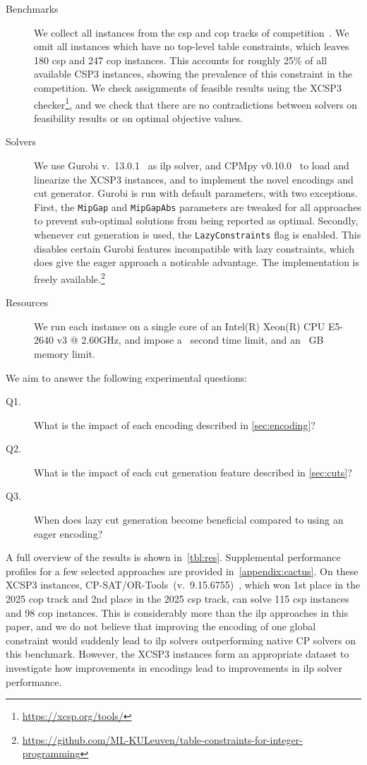 \documentclass[a4paper,UKenglish,cleveref,autoref,thm-restate]{lipics-v2021}
\newcommand{\milp}{\gls{ilp}\xspace}
\begin{document}
\begin{description}
    \item[Benchmarks] We collect all instances from the \gls{csp} and \acrshort{cop} tracks of \XCSPYears competition~\cite{audemard2025proceedings2025xcsp3competition}.
    We omit all instances which have no top-level table constraints, which leaves 180 \gls{csp} and 247 \gls{cop} instances. This accounts for roughly 25\% of all available CSP3 instances, showing the prevalence of this constraint in the competition. We check assignments of feasible results using the XCSP3 checker\footnote{\url{https://xcsp.org/tools/}}, and we check that there are no contradictions between solvers on feasibility results or on optimal objective values.
    \item[Solvers] We use Gurobi v.~13.0.1~\cite{gurobi} as \milp solver, and CPMpy v0.10.0~\cite{guns2019increasing} to load and linearize the XCSP3 instances, and to implement the novel encodings and cut generator. Gurobi is run with default parameters, with two exceptions. First, the \texttt{MipGap} and \texttt{MipGapAbs} parameters are tweaked for all approaches to prevent sub-optimal solutions from being reported as optimal. Secondly, whenever cut generation is used, the \texttt{LazyConstraints} flag is enabled. This disables certain Gurobi features incompatible with lazy constraints, which does give the eager approach a noticable advantage. The implementation is freely available.\footnote{\url{https://github.com/ML-KULeuven/table-constraints-for-integer-programming}}
    \item[Resources] We run each instance on a single core of an Intel(R) Xeon(R) CPU E5-2640 v3 @ 2.60GHz, and impose a \timeout~second time limit, and an \memout~GB memory limit.
\end{description}

\noindent We aim to answer the following experimental questions:

\begin{description}
    \item[Q1.] What is the impact of each encoding described in \cref{sec:encoding}?
    \item[Q2.] What is the impact of each cut generation feature described in \cref{sec:cuts}?
    \item[Q3.] When does lazy cut generation become beneficial compared to using an eager encoding?
\end{description}

A full overview of the results is shown in~\cref{tbl:res}.
Supplemental performance profiles for a few selected approaches are provided in~\cref{appendix:cactus}.
On these XCSP3 instances, CP-SAT/OR-Tools~(v.~9.15.6755)~\cite{cpsatlp}, which won 1st place in the 2025 \gls{cop} track and 2nd place in the 2025 \gls{csp} track, can solve 115 \gls{csp} instances and 98 \gls{cop} instances.
This is considerably more than the \milp approaches in this paper, and we do not believe that improving the encoding of one global constraint would suddenly lead to \milp solvers outperforming native CP solvers on this benchmark.
However, the XCSP3 instances form an appropriate dataset to investigate how improvements in encodings lead to improvements in \milp solver performance.
\end{document}
